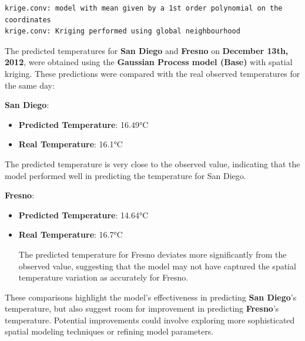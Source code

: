 \documentclass[
  11pt,
]{article}
\newenvironment{Shaded}{\begin{snugshade}}{\end{snugshade}}
\newcommand{\CommentTok}[1]{\textcolor[rgb]{0.37,0.37,0.37}{#1}}
\newcommand{\NormalTok}[1]{\textcolor[rgb]{0.00,0.23,0.31}{#1}}
\newcommand{\OtherTok}[1]{\textcolor[rgb]{0.00,0.23,0.31}{#1}}
\newcommand{\SpecialCharTok}[1]{\textcolor[rgb]{0.37,0.37,0.37}{#1}}
\begin{document}
\begin{verbatim}
krige.conv: model with mean given by a 1st order polynomial on the coordinates
krige.conv: Kriging performed using global neighbourhood 
\end{verbatim}

\begin{Shaded}
\end{Shaded}

The predicted temperatures for \textbf{San Diego} and \textbf{Fresno} on
\textbf{December 13th, 2012}, were obtained using the \textbf{Gaussian
Process model (Base)} with spatial kriging. These predictions were
compared with the real observed temperatures for the same day:

\textbf{San Diego}:

\begin{itemize}
\item
  \textbf{Predicted Temperature}: 16.49°C
\item
  \textbf{Real Temperature}: 16.1°C
\end{itemize}

The predicted temperature is very close to the observed value,
indicating that the model performed well in predicting the temperature
for San Diego.

\textbf{Fresno}:

\begin{itemize}
\item
  \textbf{Predicted Temperature}: 14.64°C
\item
  \textbf{Real Temperature}: 16.7°C

  The predicted temperature for Fresno deviates more significantly from
  the observed value, suggesting that the model may not have captured
  the spatial temperature variation as accurately for Fresno.
\end{itemize}

These comparisons highlight the model's effectiveness in predicting
\textbf{San Diego}'s temperature, but also suggest room for improvement
in predicting \textbf{Fresno}'s temperature. Potential improvements
could involve exploring more sophisticated spatial modeling techniques
or refining model parameters.
\end{document}
